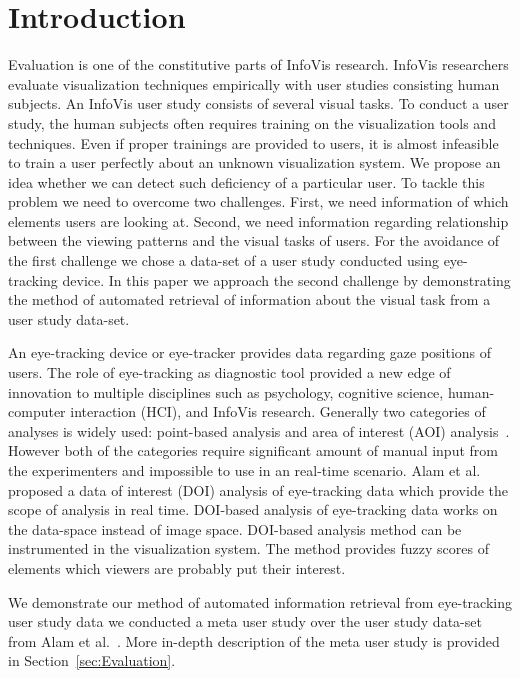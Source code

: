 \section{Introduction}

Evaluation is one of the constitutive parts of InfoVis research. InfoVis researchers evaluate visualization techniques empirically with user studies consisting human subjects. An InfoVis user study consists of several visual tasks. To conduct a user study, the human subjects often requires training on the visualization tools and techniques. Even if proper trainings are provided to users, it is almost infeasible to train a user perfectly about an unknown visualization system. We propose an idea whether we can detect such deficiency of a particular user. To tackle this problem we need to overcome two challenges. First, we need information of which elements users are looking at. Second, we need information regarding relationship between the viewing patterns and the visual tasks of users. For the avoidance of the first challenge we chose a data-set of a user study conducted using eye-tracking device. In this paper we approach the second challenge by demonstrating the method of automated retrieval of information about the visual task from a user study data-set. 

An eye-tracking device or eye-tracker provides data regarding gaze positions of users. The role of eye-tracking as diagnostic tool provided a new edge of innovation to multiple disciplines such as psychology, cognitive science, human-computer interaction (HCI), and InfoVis research. Generally two categories of analyses is widely used: point-based analysis and area of interest (AOI) analysis~\cite{blascheckstate}. However both of the categories require significant amount of manual input from the experimenters and impossible to use in an real-time scenario. Alam et al.~\cite{alamdata} proposed a data of interest (DOI) analysis of eye-tracking data which provide the scope of analysis in real time. DOI-based analysis of eye-tracking data works on the data-space instead of image space. DOI-based analysis method can be instrumented in the visualization system. The method provides fuzzy scores of elements which viewers are probably put their interest. 

We demonstrate our method of automated information retrieval from eye-tracking user study data we conducted a meta user study over the user study data-set from Alam et al.~\cite{alamdata}. More in-depth description of the meta user study is provided in Section~\ref{sec:Evaluation}. 
